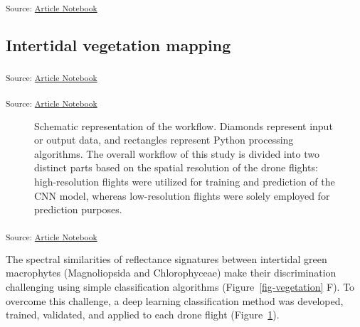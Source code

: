 \documentclass[
  number]{elsarticle}
\begin{document}
\textsubscript{Source:
\href{https://SigOiry.github.io/Drone_Paper_2023/index.qmd.html}{Article
Notebook}}

\subsection{Intertidal vegetation
mapping}\label{intertidal-vegetation-mapping}

\textsubscript{Source:
\href{https://SigOiry.github.io/Drone_Paper_2023/index.qmd.html}{Article
Notebook}}

\textsubscript{Source:
\href{https://SigOiry.github.io/Drone_Paper_2023/index.qmd.html}{Article
Notebook}}

\label{cell-fig-workflow}
\begin{figure}[H]


\caption{\label{fig-workflow}Schematic representation of the workflow.
Diamonds represent input or output data, and rectangles represent Python
processing algorithms. The overall workflow of this study is divided
into two distinct parts based on the spatial resolution of the drone
flights: high-resolution flights were utilized for training and
prediction of the CNN model, whereas low-resolution flights were solely
employed for prediction purposes.}

\end{figure}%

\textsubscript{Source:
\href{https://SigOiry.github.io/Drone_Paper_2023/index.qmd.html}{Article
Notebook}}

The spectral similarities of reflectance signatures between intertidal
green macrophytes (Magnoliopsida and Chlorophyceae) make their
discrimination challenging using simple classification algorithms
(Figure~\ref{fig-vegetation} F). To overcome this challenge, a deep
learning classification method was developed, trained, validated, and
applied to each drone flight (Figure~\ref{fig-workflow}).
\end{document}
